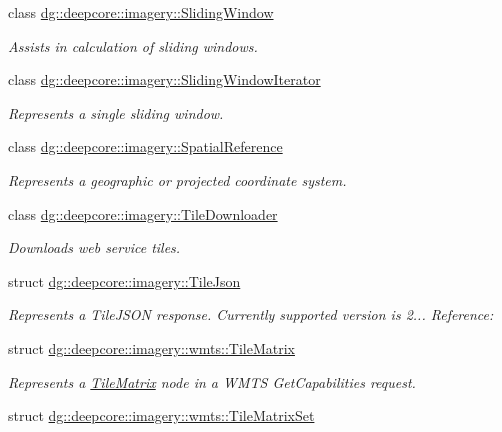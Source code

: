 \begin{DoxyCompactItemize}
class \hyperlink{classdg_1_1deepcore_1_1imagery_1_1_sliding_window}{dg\+::deepcore\+::imagery\+::\+Sliding\+Window}
\begin{DoxyCompactList}\small\item\em Assists in calculation of sliding windows. \end{DoxyCompactList}\item 
class \hyperlink{classdg_1_1deepcore_1_1imagery_1_1_sliding_window_iterator}{dg\+::deepcore\+::imagery\+::\+Sliding\+Window\+Iterator}
\begin{DoxyCompactList}\small\item\em Represents a single sliding window. \end{DoxyCompactList}\item 
class \hyperlink{classdg_1_1deepcore_1_1imagery_1_1_spatial_reference}{dg\+::deepcore\+::imagery\+::\+Spatial\+Reference}
\begin{DoxyCompactList}\small\item\em Represents a geographic or projected coordinate system. \end{DoxyCompactList}\item 
class \hyperlink{structdg_1_1deepcore_1_1imagery_1_1_tile_downloader}{dg\+::deepcore\+::imagery\+::\+Tile\+Downloader}
\begin{DoxyCompactList}\small\item\em Downloads web service tiles. \end{DoxyCompactList}\item 
struct \hyperlink{structdg_1_1deepcore_1_1imagery_1_1_tile_json}{dg\+::deepcore\+::imagery\+::\+Tile\+Json}
\begin{DoxyCompactList}\small\item\em Represents a Tile\+J\+S\+ON response. Currently supported version is 2... Reference\+: \href{https://github.com/mapbox/tilejson-spec/tree/master/2.0.0}{\tt } \end{DoxyCompactList}\item 
struct \hyperlink{structdg_1_1deepcore_1_1imagery_1_1wmts_1_1_tile_matrix}{dg\+::deepcore\+::imagery\+::wmts\+::\+Tile\+Matrix}
\begin{DoxyCompactList}\small\item\em Represents a \hyperlink{structdg_1_1deepcore_1_1imagery_1_1wmts_1_1_tile_matrix}{Tile\+Matrix} node in a W\+M\+TS Get\+Capabilities request. \end{DoxyCompactList}\item 
struct \hyperlink{structdg_1_1deepcore_1_1imagery_1_1wmts_1_1_tile_matrix_set}{dg\+::deepcore\+::imagery\+::wmts\+::\+Tile\+Matrix\+Set}

\end{DoxyCompactItemize}
